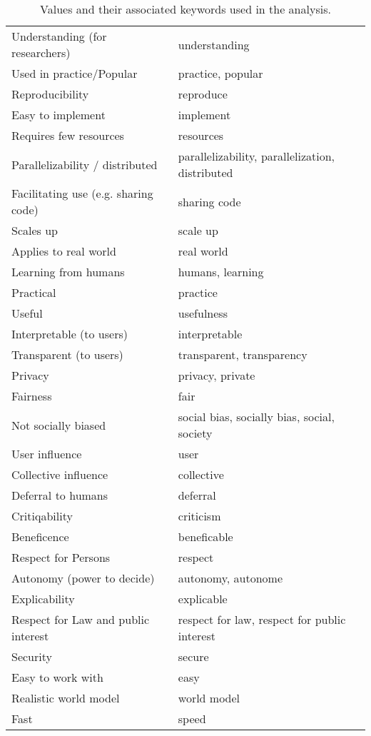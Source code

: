\documentclass{article}
\begin{document}
\begin{table}[h]
\begin{tabular}{|l|l|}
        Understanding (for researchers) & understanding \\
        Used in practice/Popular & practice, popular \\
        Reproducibility & reproduce \\
        Easy to implement & implement \\
        Requires few resources & resources \\
        Parallelizability / distributed & parallelizability, parallelization, distributed \\
        Facilitating use (e.g. sharing code) & sharing code \\
        Scales up & scale up \\
        Applies to real world & real world \\
        Learning from humans & humans, learning \\
        Practical & practice \\
        Useful & usefulness \\
        Interpretable (to users) & interpretable \\
        Transparent (to users) & transparent, transparency \\
        Privacy & privacy, private \\
        Fairness & fair \\
        Not socially biased & social bias, socially bias, social, society \\
        User influence & user \\
        Collective influence & collective \\
        Deferral to humans & deferral \\
        Critiqability & criticism \\
        Beneficence & beneficable \\
        Respect for Persons & respect \\
        Autonomy (power to decide) & autonomy, autonome \\
        Explicability & explicable \\
        Respect for Law and public interest & respect for law, respect for public interest \\
        Security & secure \\
        Easy to work with & easy \\
        Realistic world model & world model \\
        Fast & speed \\
        \hline
    \end{tabular}
    \caption{Values and their associated keywords used in the analysis.}
    \label{tab:keyword_table}
\end{table}
\end{document}
